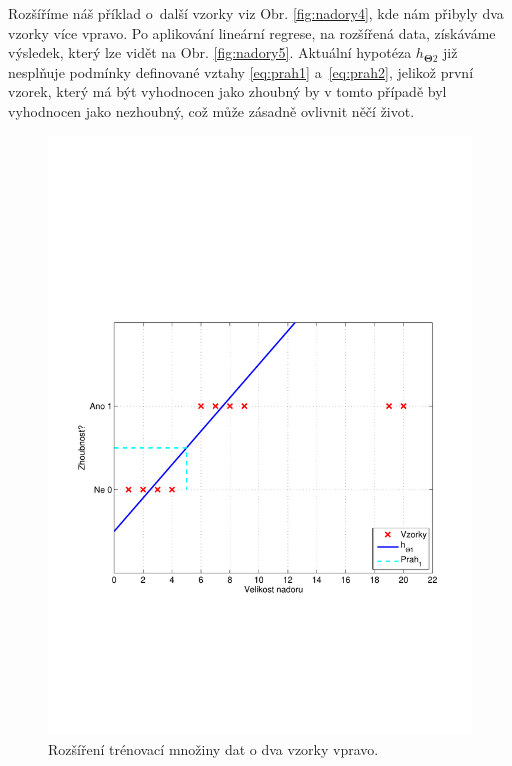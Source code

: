 \par{Rozšíříme náš příklad o~další vzorky viz Obr. \ref{fig:nadory4}, kde nám přibyly dva vzorky více vpravo. Po aplikování lineární regrese, na rozšířená data, získáváme výsledek, který lze vidět na Obr. \ref{fig:nadory5}. Aktuální hypotéza $h_{\bm{\Theta} 2}$ již nesplňuje podmínky definované vztahy \ref{eq:prah1} a~\ref{eq:prah2}, jelikož první vzorek, který má být vyhodnocen jako zhoubný by v tomto případě byl vyhodnocen jako nezhoubný, což může zásadně ovlivnit něčí život.

\begin{figure}[!ht]
	\centering
	\begin{minipage}[b]{0.48\textwidth}
		\includegraphics[width = \textwidth, trim = 2.5cm 7cm 2cm 9cm]{./Img/BinarniRegrese/prikladNadory/tumor_4st_example.pdf}
		\caption{Rozšíření trénovací množiny dat o dva vzorky vpravo. \\ ~}

\end{minipage}
\end{figure}}
